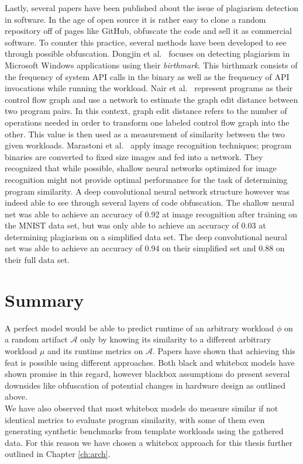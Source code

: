 \documentclass[../bachelor_paper.tex]{subfiles}
\begin{document}
Lastly, several papers have been published about the issue of plagiarism detection in software. In the age of open source it is rather easy to clone a random repository off of pages like GitHub, obfuscate the code and sell it as commercial software. To counter this practice, several methods have been developed to see through possible obfuscation. Dongjin et al.\ \cite{kimMeasuringSimilarityWindows2013} focuses on detecting plagiarism in Microsoft Windows applications using their \emph{birthmark}. This birthmark consists of the frequency of system \acs{API} calls in the binary as well as the frequency of \acs{API} invocations while running the workload. Nair et al.\ \cite{nairFuncGNNGraphNeural2020} represent programs as their control flow graph and use a network to estimate the graph edit distance between two program pairs. In this context, graph edit distance refers to the number of operations needed in order to transform one labeled control flow graph into the other. This value is then used as a measurement of similarity between the two given workloads. Marastoni et al.\ \cite{marastoniDeepLearningApproach2018} apply image recognition techniques; program binaries are converted to fixed size images and fed into a network. They recognized that while possible, shallow neural networks optimized for image recognition might not provide optimal performance for the task of determining program similarity. A deep convolutional neural network structure however was indeed able to see through several layers of code obfuscation. The shallow neural net was able to achieve an accuracy of 0.92 at image recognition after training on the MNIST data set, but was only able to achieve an accuracy of 0.03 at determining plagiarism on a simplified data set. The deep convolutional neural net was able to achieve an accuracy of 0.94 on their simplified set and 0.88 on their full data set.

\section{Summary}
	\label{ch:theo/simi/summ}
A perfect model would be able to predict runtime of an arbitrary workload $\phi$ on a random artifact $\mathcal{A}$ only by knowing its similarity to a different arbitrary workload $\mu$ and its runtime metrics on $\mathcal{A}$. Papers have shown that achieving this feat is possible using different approaches. Both black and whitebox models have shown promise in this regard, however blackbox assumptions do present several downsides like obfuscation of potential changes in hardware design as outlined above.\\
We have also observed that most whitebox models do measure similar if not identical metrics to evaluate program similarity, with some of them even generating synthetic benchmarks from template workloads using the gathered data. For this reason we have chosen a whitebox approach for this thesis further outlined in Chapter \ref{ch:arch}.



\isstandalone



\fi
\end{document}
